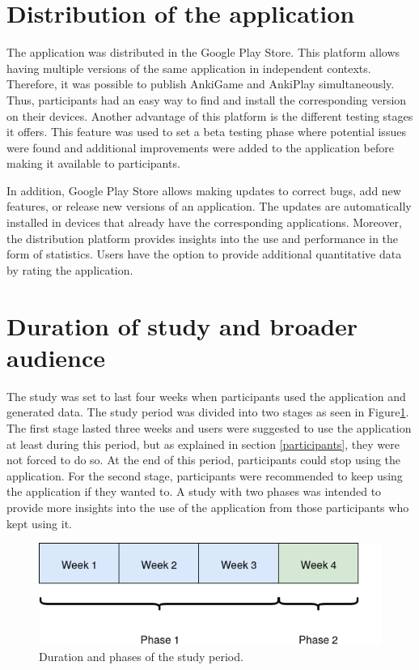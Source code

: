 \section{Distribution of the application}
The application was distributed in the Google Play Store. This platform allows having multiple versions of the same application in independent contexts. Therefore, it was possible to publish AnkiGame and AnkiPlay simultaneously. Thus, participants had an easy way to find and install the corresponding version on their devices. Another advantage of this platform is the different testing stages it offers. This feature was used to set a beta testing phase where potential issues were found and additional improvements were added to the application before making it available to participants.

In addition, Google Play Store allows making updates to correct bugs, add new features, or release new versions of an application. The updates are automatically installed in devices that already have the corresponding applications. Moreover, the distribution platform provides insights into the use and performance in the form of statistics. Users have the option to provide additional quantitative data by rating the application.

\section{Duration of study and broader audience}
The study was set to last four weeks when participants used the application and generated data. The study period was divided into two stages as seen in Figure\ref{fig:study-period}. The first stage lasted three weeks and users were suggested to use the application at least during this period, but as explained in section \ref{participants}, they were not forced to do so. At the end of this period, participants could stop using the application. For the second stage, participants were recommended to keep using the application if they wanted to. A study with two phases was intended to provide more insights into the use of the application from those participants who kept using it.

\begin{figure}[htb]
    \vskip 5mm
        \begin{center}
            \includegraphics[scale=0.7]{./Figures/study_period.png}
            \caption{Duration and phases of the study period.}
            \label{fig:study-period}
        \end{center}
    \vskip -5mm
\end{figure}

